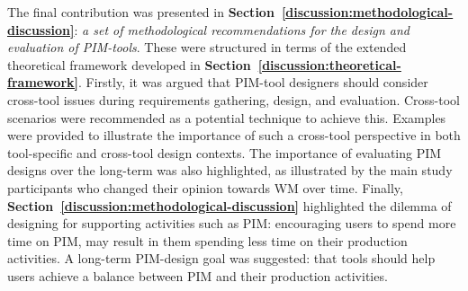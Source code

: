 The final contribution was presented in \textbf{Section~\ref{discussion:methodological-discussion}}: \textit{a set of methodological recommendations for the design and evaluation of PIM-tools}.  These were structured in terms of the extended theoretical framework developed in \textbf{Section~\ref{discussion:theoretical-framework}}.  Firstly, it was argued that PIM-tool designers should consider cross-tool issues during requirements gathering, design, and evaluation.  Cross-tool scenarios were recommended as a potential technique to achieve this.  Examples were provided to illustrate the importance of such a cross-tool perspective in both tool-specific and cross-tool design contexts. The importance of evaluating PIM designs over the long-term was also highlighted, as illustrated by the main study participants who changed their opinion towards WM over time.  Finally, \textbf{Section~\ref{discussion:methodological-discussion}} highlighted the dilemma of designing for supporting activities such as PIM: encouraging users to spend more time on PIM, may result in them spending less time on their production activities.  A long-term PIM-design goal was suggested: that tools should help users achieve a balance between PIM and their production activities.  %







